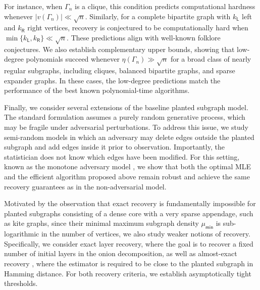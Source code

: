 \documentclass[12pt]{article}
\newcommand{\s}[1]{\mathsf{#1}}
\begin{document}
\centerline{\noindent{}}
\vspace{0.2cm}

\noindent For instance, when $\Gamma_n$ is a clique, this condition predicts computational hardness whenever $|v(\Gamma_n)| \ll \sqrt{n}$. Similarly, for a complete bipartite graph with $k_{\s{L}}$ left and $k_{\s{R}}$ right vertices, recovery is conjectured to be computationally hard when $\min\{k_{\s{L}},k_{\s{R}}\} \ll \sqrt{n}$. These predictions align with well-known folklore conjectures. We also establish complementary upper bounds, showing that low-degree polynomials succeed whenever $\eta(\Gamma_n)\gg \sqrt{n}$ for a broad class of nearly regular subgraphs, including cliques, balanced bipartite graphs, and sparse expander graphs. In these cases, the low-degree predictions match the performance of the best known polynomial-time algorithms.

Finally, we consider several extensions of the baseline planted subgraph model. The standard formulation assumes a purely random generative process, which may be fragile under adversarial perturbations. To address this issue, we study semi-random models in which an adversary may delete edges outside the planted subgraph and add edges inside it prior to observation. Importantly, the statistician does not know which edges have been modified. For this setting, known as the monotone adversary model \cite{feige2000finding,feige2001heuristics}, we show that both the optimal MLE and the efficient algorithm proposed above remain robust and achieve the same recovery guarantees as in the non-adversarial model.

Motivated by the observation that exact recovery is fundamentally impossible for planted subgraphs consisting of a dense core with a very sparse appendage, such as kite graphs, since their minimal maximum subgraph density $\mu_{\s{min}}$ is sub-logarithmic in the number of vertices, we also study weaker notions of recovery. Specifically, we consider exact layer recovery, where the goal is to recover a fixed number of initial layers in the onion decomposition, as well as almost-exact recovery \cite{hajek2016information,wu2018statistical}, where the estimator is required to be close to the planted subgraph in Hamming distance. For both recovery criteria, we establish asymptotically tight thresholds.
\end{document}
